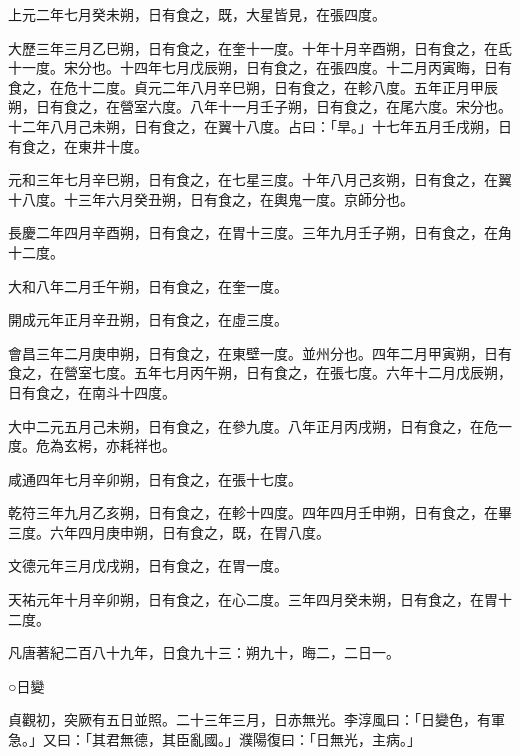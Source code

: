 \begin{pinyinscope}
 上元二年七月癸未朔，日有食之，既，大星皆見，在張四度。



 大歷三年三月乙巳朔，日有食之，在奎十一度。十年十月辛酉朔，日有食之，在氐十一度。宋分也。十四年七月戊辰朔，日有食之，在張四度。十二月丙寅晦，日有食之，在危十二度。貞元二年八月辛巳朔，日有食之，在軫八度。五年正月甲辰朔，日有食之，在營室六度。八年十一月壬子朔，日有食之，在尾六度。宋分也。十二年八月己未朔，日有食之，在翼十八度。占曰：「旱。」十七年五月壬戌朔，日有食之，在東井十度。



 元和三年七月辛巳朔，日有食之，在七星三度。十年八月己亥朔，日有食之，在翼十八度。十三年六月癸丑朔，日有食之，在輿鬼一度。京師分也。



 長慶二年四月辛酉朔，日有食之，在胃十三度。三年九月壬子朔，日有食之，在角十二度。



 大和八年二月壬午朔，日有食之，在奎一度。



 開成元年正月辛丑朔，日有食之，在虛三度。



 會昌三年二月庚申朔，日有食之，在東壁一度。並州分也。四年二月甲寅朔，日有食之，在營室七度。五年七月丙午朔，日有食之，在張七度。六年十二月戊辰朔，日有食之，在南斗十四度。



 大中二元五月己未朔，日有食之，在參九度。八年正月丙戌朔，日有食之，在危一度。危為玄枵，亦耗祥也。



 咸通四年七月辛卯朔，日有食之，在張十七度。



 乾符三年九月乙亥朔，日有食之，在軫十四度。四年四月壬申朔，日有食之，在畢三度。六年四月庚申朔，日有食之，既，在胃八度。



 文德元年三月戊戌朔，日有食之，在胃一度。



 天祐元年十月辛卯朔，日有食之，在心二度。三年四月癸未朔，日有食之，在胃十二度。



 凡唐著紀二百八十九年，日食九十三：朔九十，晦二，二日一。



 ○日變



 貞觀初，突厥有五日並照。二十三年三月，日赤無光。李淳風曰：「日變色，有軍急。」又曰：「其君無德，其臣亂國。」濮陽復曰：「日無光，主病。」




\end{pinyinscope}
